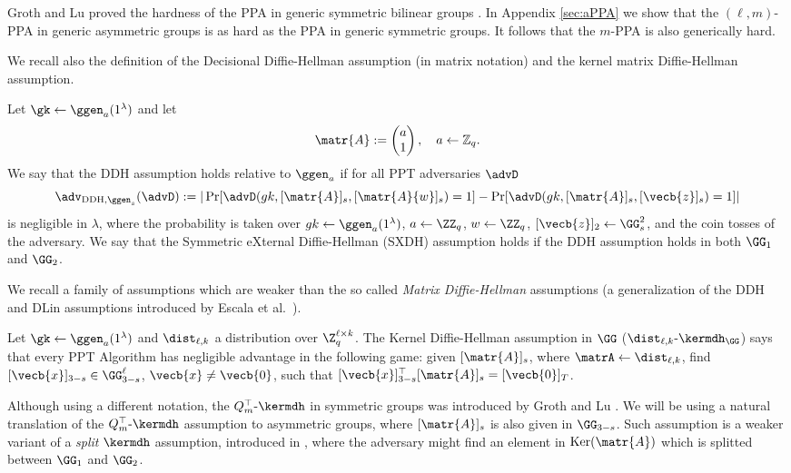 Groth and Lu proved the hardness of the PPA in generic symmetric bilinear groups \cite{AC:GroLu07}. In Appendix \ref{sec:aPPA} we show that the $(\ell,m)$-PPA in generic asymmetric groups is as hard as the PPA in generic symmetric groups. It follows that the $m$-PPA is also generically hard.

We recall also the definition of the Decisional Diffie-Hellman assumption (in matrix notation) and the kernel matrix Diffie-Hellman assumption.

\begin{definition}\label{def:dlin}
 Let  $\gk 
\gets \ggen_a(1^\lambda)$ and let
$$
\matr{A} :=
\begin{pmatrix} 
a     \\
1
\end{pmatrix},
\quad
a\gets\mathbb{Z}_q.
$$
We say that the DDH assumption holds relative to $\ggen_a$ if for all PPT adversaries $\advD$
$$
\adv_{\mathrm{DDH},\ggen_s}(\advD) := |
	\Pr[
		\advD(
			gk,
			[\matr{A}]_s,
			[\matr{A}{w}]_s)=1]
	-\Pr[
		\advD(
		gk,
		[\matr{A}]_s,
		[\vecb{z}]_s)=1]|
$$
is negligible in $\lambda$, where the probability is taken over $gk\gets\ggen_a(1^\lambda)$, $a\gets\ZZ_q$, ${w}\gets\ZZ_q$, $[\vecb{z}]_2\gets\GG^2_s$, and the coin tosses of the adversary.
We say that the Symmetric eXternal Diffie-Hellman (SXDH) assumption holds if the DDH assumption holds in both $\GG_1$ and $\GG_2$.
\end{definition}

We recall a family of assumptions which are weaker than the so called \emph{Matrix Diffie-Hellman} assumptions (a generalization of the DDH and DLin assumptions introduced by Escala et al.~\cite{C:EHKRV13}).
\begin{definition} Let  $\gk 
\gets\ggen_a(1^\lambda)$ and $\dist_{\ell,k}$ a distribution over $\Z_q^{\ell\times k}$.
The Kernel Diffie-Hellman assumption in $\GG$ ($\dist_{\ell,k}\mbox{-}\kermdh_{\GG}$) says that every PPT Algorithm has negligible advantage in the following  game: given $[\matr{A}]_s$, where $\matrA \gets \dist_{\ell,k}$, find $[\vecb{x}]_{3-s} \in \GG^{\ell}_{3-s}$, $\vecb{x} \neq \vecb{0}$, such that 
$[\vecb{x}]_{3-s}^{\top}[\matr{A}]_s=[\vecb{0}]_T$. 
\end{definition}
Although using a different notation, the $Q_m^\top\mbox{-}\kermdh$ in symmetric groups was introduced by Groth and Lu \cite{AC:GroLu07}.
We will be using a natural translation of the $Q_m^\top\mbox{-}\kermdh$ assumption to asymmetric groups, where  $[\matr{A}]_s$ is also given in $\GG_{3-s}$.  Such assumption is a weaker variant of a \emph{split} $\kermdh$ assumption, introduced in \cite{AC:GonHevRaf15}, where the adversary might find an element in $\mathrm{Ker}(\matr{A})$ which is splitted between $\GG_1$ and $\GG_2$.

